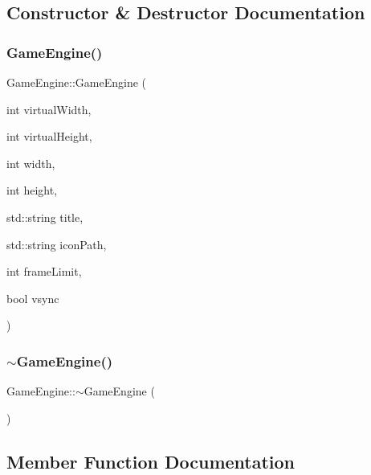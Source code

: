 \subsection{Constructor \& Destructor Documentation}
\mbox{\label{class_game_engine_a5365f65c15fa45ab2f6e4e661f6fbd5f}} 
\subsubsection{\texorpdfstring{GameEngine()}{GameEngine()}}
{\footnotesize\ttfamily Game\+Engine\+::\+Game\+Engine (\begin{DoxyParamCaption}\item[{int}]{virtual\+Width,  }\item[{int}]{virtual\+Height,  }\item[{int}]{width,  }\item[{int}]{height,  }\item[{std\+::string}]{title,  }\item[{std\+::string}]{icon\+Path,  }\item[{int}]{frame\+Limit,  }\item[{bool}]{vsync }\end{DoxyParamCaption})}

\mbox{\label{class_game_engine_a8e59d8341ef9d2dcc62eee1437e37f14}} 
\subsubsection{\texorpdfstring{$\sim$GameEngine()}{~GameEngine()}}
{\footnotesize\ttfamily Game\+Engine\+::$\sim$\+Game\+Engine (\begin{DoxyParamCaption}{ }\end{DoxyParamCaption})\hspace{0.3cm}{\ttfamily [inline]}}



\subsection{Member Function Documentation}
\mbox{\label{class_game_engine_a2a83394496e5c9060b9f8ddb5a7abd24}} 
